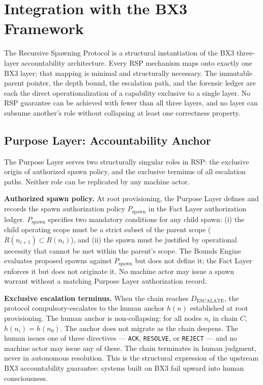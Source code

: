 \section{Integration with the BX3 Framework}
\label{sec:rs-integration}

The Recursive Spawning Protocol is a structural instantiation of the BX3 three-layer accountability architecture. Every RSP mechanism maps onto exactly one BX3 layer; that mapping is minimal and structurally necessary. The immutable parent pointer, the depth bound, the escalation path, and the forensic ledger are each the direct operationalization of a capability exclusive to a single layer. No RSP guarantee can be achieved with fewer than all three layers, and no layer can subsume another's role without collapsing at least one correctness property.

\subsection{Purpose Layer: Accountability Anchor}
\label{sec:rs-purpose-anchor}

The Purpose Layer serves two structurally singular roles in RSP: the exclusive origin of authorized spawn policy, and the exclusive terminus of all escalation paths. Neither role can be replicated by any machine actor.

\medskip
\noindent\textbf{Authorized spawn policy.} At root provisioning, the Purpose Layer defines and records the spawn authorization policy $P_{\mathrm{spawn}}$ in the Fact Layer authorization ledger. $P_{\mathrm{spawn}}$ specifies two mandatory conditions for any child spawn: (i) the child operating scope must be a strict subset of the parent scope ($R(n_{i+1}) \subset R(n_i)$), and (ii) the spawn must be justified by operational necessity that cannot be met within the parent's scope. The Bounds Engine evaluates proposed spawns against $P_{\mathrm{spawn}}$ but does not define it; the Fact Layer enforces it but does not originate it. No machine actor may issue a spawn warrant without a matching Purpose Layer authorization record.

\medskip
\noindent\textbf{Exclusive escalation terminus.} When the chain reaches $D_{\mathrm{ESCALATE}}$, the protocol compulsory-escalates to the human anchor $h(n)$ established at root provisioning. The human anchor is non-collapsing: for all nodes $n_i$ in chain $C$, $h(n_i) = h(n_0)$. The anchor does not migrate as the chain deepens. The human issues one of three directives — \texttt{ACK}, \texttt{RESOLVE}, or \texttt{REJECT} — and no machine actor may issue any of these. The chain terminates in human judgment, never in autonomous resolution. This is the structural expression of the upstream BX3 accountability guarantee: systems built on BX3 fail upward into human consciousness.

